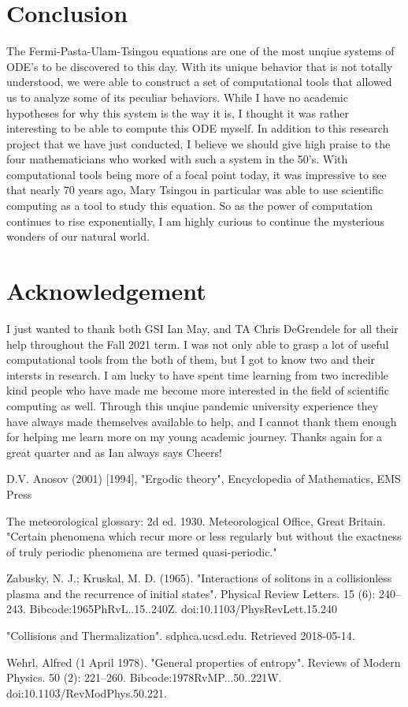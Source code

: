 \section{Conclusion}

The Fermi-Pasta-Ulam-Tsingou equations are one of the most unqiue systems of ODE's to be discovered to this day. With its unique behavior that is not totally understood, we were able to construct a set of computational tools that allowed us to analyze some of its peculiar behaviors. While I have no academic hypotheses for why this system is the way it is, I thought it was rather interesting to be able to compute this ODE myself. In addition to this research project that we have just conducted, I believe we should give high praise to the four mathematicians who worked with such a system in the 50's. With computational tools being more of a focal point today, it was impressive to see that nearly 70 years ago, Mary Tsingou in particular was able to use scientific computing as a tool to study this equation. So as the power of computation continues to rise exponentially, I am highly curious to continue the mysterious wonders of our natural world.

\section{Acknowledgement}

I just wanted to thank both GSI Ian May, and TA Chris DeGrendele for all their help throughout the Fall 2021 term. I was not only able to grasp a lot of useful computational tools from the both of them, but I got to know two and their intersts in research. I am lucky to have spent time learning from two incredible kind people who have made me become more interested in the field of scientific computing as well. Through this unqiue pandemic university experience they have always made themselves available to help, and I cannot thank them enough for helping me learn more on my young academic journey. Thanks again for a great quarter and as Ian always says Cheers!  

\begin{thebibliography}{15}


 D.V. Anosov (2001) [1994], "Ergodic theory", Encyclopedia of Mathematics, EMS Press

 The meteorological glossary: 2d ed. 1930. Meteorological Office, Great Britain. "Certain phenomena which recur more or less regularly but without the exactness of truly periodic phenomena are termed quasi-periodic."

 Zabusky, N. J.; Kruskal, M. D. (1965). "Interactions of solitons in a collisionless plasma and the recurrence of initial states". Physical Review Letters. 15 (6): 240–243. Bibcode:1965PhRvL..15..240Z. doi:10.1103/PhysRevLett.15.240

  "Collisions and Thermalization". sdphca.ucsd.edu. Retrieved 2018-05-14.

  Wehrl, Alfred (1 April 1978). "General properties of entropy". Reviews of Modern Physics. 50 (2): 221–260. Bibcode:1978RvMP...50..221W. doi:10.1103/RevModPhys.50.221.
\end{thebibliography}

